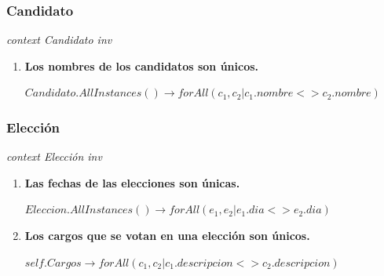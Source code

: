 \subsubsection*{Candidato}

\textit{context Candidato
inv}

\begin{enumerate}
\item \textbf{Los nombres de los candidatos son únicos.}

$Candidato.AllInstances() \rightarrow forAll(c_1, c_2 | c_1.nombre <>c_2.nombre)$

\end{enumerate}


\subsubsection*{Elecci\'on}

\textit{context Elecci\'on
inv}

\begin{enumerate}
\item \textbf{Las fechas de las elecciones son \'unicas.}

$Eleccion.AllInstances() \rightarrow forAll(e_1, e_2 | e_1.dia <>e_2.dia)$

\item \textbf{Los cargos que se votan en una elecci\'on son \'unicos.}

$self.Cargos \rightarrow forAll(c_1, c_2 |c_1.descripcion <> c_2.descripcion)$

\end{enumerate}

\newpage